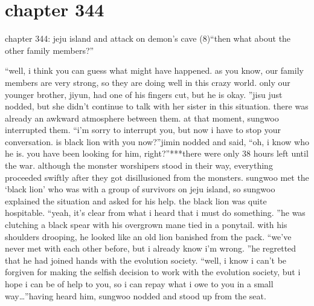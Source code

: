 \section{chapter 344}

chapter 344: jeju island and attack on demon’s cave (8)“then what about the other family members?”




“well, i think you can guess what might have happened.
 as you know, our family members are very strong, so they are doing well in this crazy world.
 only our younger brother, jiyun, had one of his fingers cut, but he is okay.
”jisu just nodded, but she didn’t continue to talk with her sister in this situation.
 there was already an awkward atmosphere between them.
at that moment, sungwoo interrupted them.
“i’m sorry to interrupt you, but now i have to stop your conversation.
 is black lion with you now?”jimin nodded and said, “oh, i know who he is.
 you have been looking for him, right?”***there were only 38 hours left until the war.
 although the monster worshipers stood in their way, everything proceeded swiftly after they got disillusioned from the monsters.
sungwoo met the ‘black lion’ who was with a group of survivors on jeju island, so sungwoo explained the situation and asked for his help.
 the black lion was quite hospitable.
“yeah, it’s clear from what i heard that i must do something.
”he was clutching a black spear with his overgrown mane tied in a ponytail.
 with his shoulders drooping, he looked like an old lion banished from the pack.
“we’ve never met with each other before, but i already know i’m wrong.
”he regretted that he had joined hands with the evolution society.
“well, i know i can’t be forgiven for making the selfish decision to work with the evolution society, but i hope i can be of help to you, so i can repay what i owe to you in a small way…”having heard him, sungwoo nodded and stood up from the seat.

